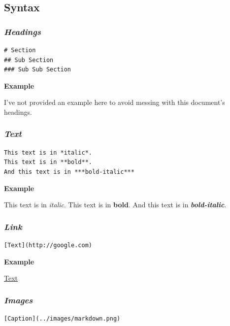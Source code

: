 \documentclass[journal,10pt,final]{IEEEtran}
\begin{document}
\subsection{Syntax}\label{syntax}

\subsubsection{\texorpdfstring{\textbf{\emph{Headings}}}{Headings}}\label{headings}

\begin{verbatim}
# Section
## Sub Section
### Sub Sub Section
\end{verbatim}

\textbf{Example}

I've not provided an example here to avoid messing with this document's
headings.

\subsubsection{\texorpdfstring{\textbf{\emph{Text}}}{Text}}\label{text}

\begin{verbatim}
This text is in *italic*.
This text is in **bold**.
And this text is in ***bold-italic***
\end{verbatim}

\textbf{Example}

This text is in \emph{italic}. This text is in \textbf{bold}. And this
text is in \textbf{\emph{bold-italic}}.

\subsubsection{\texorpdfstring{\textbf{\emph{Link}}}{Link}}\label{link}

\begin{verbatim}
[Text](http://google.com)
\end{verbatim}

\textbf{Example}

\href{http://google.com}{Text}

\subsubsection{\texorpdfstring{\textbf{\emph{Images}}}{Images}}\label{images}

\begin{verbatim}
[Caption](../images/markdown.png)
\end{verbatim}
\end{document}
